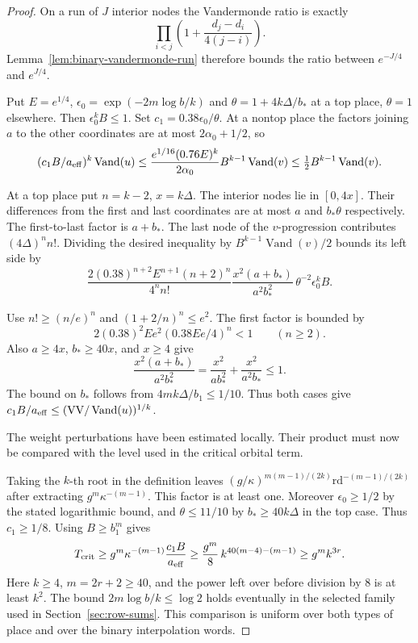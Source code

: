 \begin{proof}

On a run of \(J\) interior nodes the Vandermonde ratio is exactly
\[
 \prod_{i<j}\left(1+\frac{d_j-d_i}{4(j-i)}\right).
\]
Lemma~\ref{lem:binary-vandermonde-run} therefore bounds the ratio between
\(e^{-J/4}\) and \(e^{J/4}\).


Put \(E=e^{1/4}\), \(\epsilon_0=\exp(-2m\log b/k)\)
and \(\theta=1+4k\Delta/b_*\) at a top place,
\(\theta=1\) elsewhere. Then \(\epsilon_0^kB\le1\).
Set \(c_1=0.38\epsilon_0/\theta\).
At a nontop place the factors joining \(a\) to the other
coordinates are at most \(2\alpha_0+1/2\), so
\[
 (c_1 B/a_{\rm eff})^k\operatorname{Vand}(u)
 \le \frac{e^{1/16}(0.76E)^k}{2\alpha_0}
           B^{k-1}\operatorname{Vand}(v)
 \le \tfrac12 B^{k-1}\operatorname{Vand}(v).
\]

At a top place put \(n=k-2\), \(x=k\Delta\).
The interior nodes lie in \([0,4x]\). Their differences
from the first and last coordinates are at most \(a\)
and \(b_*\theta\) respectively. The first-to-last factor
is \(a+b_*\). The last node of the \(v\)-progression
contributes \((4\Delta)^n n!\). Dividing the desired
inequality by \(B^{k-1}\operatorname{Vand}(v)/2\)
bounds its left side by
\[
 \frac{2(0.38)^{n+2}E^{n+1}(n+2)^n}{4^n n!}
     \frac{x^2(a+b_*)}{a^2b_*^2}\,
                 \theta^{-2}\epsilon_0^kB.
\]

Use \(n!\ge(n/e)^n\) and \((1+2/n)^n\le e^2\).
The first factor is bounded by
\[
       2(0.38)^2Ee^2(0.38Ee/4)^n<1
       \qquad(n\ge2).
\]
Also \(a\ge4x\), \(b_*\ge40x\), and \(x\ge4\) give
\[
 \frac{x^2(a+b_*)}{a^2b_*^2}
      =\frac{x^2}{ab_*^2}+\frac{x^2}{a^2b_*}\le1 .
\] The bound on \(b_*\) follows from
\(4mk\Delta/b_1\le1/10\). Thus both cases give
\(c_1 B/a_{\rm eff}\le(\mathrm{VV}/\operatorname{Vand}(u))^{1/k}\).


The weight perturbations have been estimated locally. Their product must now be compared with the level used in the critical orbital term.


Taking the \(k\)-th root in the definition leaves
\((g/\kappa)^{m(m-1)/(2k)}\mathrm{rd}^{-(m-1)/(2k)}\)
after extracting \(g^m\kappa^{-(m-1)}\). This factor is at least
one. Moreover \(\epsilon_0\ge1/2\) by the stated logarithmic
bound, and \(\theta\le 11/10\) by \(b_*\ge40k\Delta\) in the top
case. Thus \(c_1\ge1/8\). Using \(B\ge b_1^m\) gives
\[
 T_{\rm crit}\ge
 g^m\kappa^{-(m-1)}\frac{c_1 B}{a_{\rm eff}}
 \ge \frac{g^m}{8}\,k^{40(m-4)-(m-1)}
 \ge g^m k^{3r}.
\]
Here \(k\ge4\), \(m=2r+2\ge40\), and the power left over
before division by 8 is at least \(k^2\).
The bound \(2m\log b/k\le\log2\) holds eventually in the
selected family used in Section~\ref{sec:row-sums}.
This comparison is uniform over both types of place
and over the binary interpolation words.
\end{proof}
